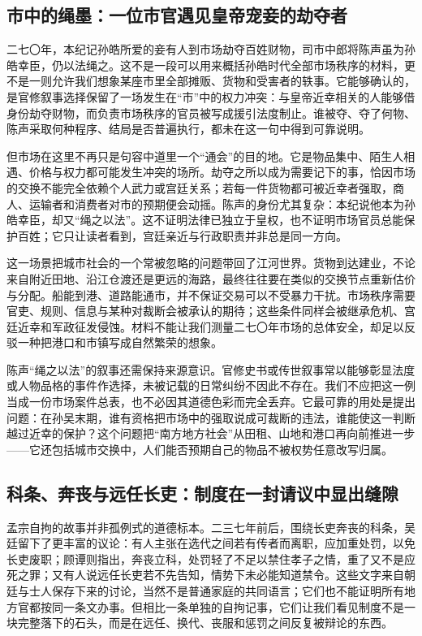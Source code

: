 \subsection{市中的绳墨：一位市官遇见皇帝宠妾的劫夺者}
二七〇年，本纪记孙皓所爱的妾有人到市场劫夺百姓财物，司市中郎将陈声虽为孙皓幸臣，仍以法绳之。这不是一段可以用来概括孙皓时代全部市场秩序的材料，更不是一则允许我们想象某座市里全部摊贩、货物和受害者的轶事。它能够确认的，是官修叙事选择保留了一场发生在“市”中的权力冲突：与皇帝近幸相关的人能够借身份劫夺财物，而负责市场秩序的官员被写成援引法度制止。谁被夺、夺了何物、陈声采取何种程序、结局是否普遍执行，都未在这一句中得到可靠说明。

但市场在这里不再只是句容中道里一个“通会”的目的地。它是物品集中、陌生人相遇、价格与权力都可能发生冲突的场所。劫夺之所以成为需要记下的事，恰因市场的交换不能完全依赖个人武力或宫廷关系；若每一件货物都可被近幸者强取，商人、运输者和消费者对市的预期便会动摇。陈声的身份尤其复杂：本纪说他本为孙皓幸臣，却又“绳之以法”。这不证明法律已独立于皇权，也不证明市场官员总能保护百姓；它只让读者看到，宫廷亲近与行政职责并非总是同一方向。

这一场景把城市社会的一个常被忽略的问题带回了江河世界。货物到达建业，不论来自附近田地、沿江仓渡还是更远的海路，最终往往要在类似的交换节点重新估价与分配。船能到港、道路能通市，并不保证交易可以不受暴力干扰。市场秩序需要官吏、规则、信息与某种对裁断会被承认的期待；这些条件同样会被继承危机、宫廷近幸和军政征发侵蚀。材料不能让我们测量二七〇年市场的总体安全，却足以反驳一种把港口和市镇写成自然繁荣的想象。

陈声“绳之以法”的叙事还需保持来源意识。官修史书或传世叙事常以能够彰显法度或人物品格的事件作选择，未被记载的日常纠纷不因此不存在。我们不应把这一例当成一份市场案件总表，也不必因其道德色彩而完全丢弃。它最可靠的用处是提出问题：在孙吴末期，谁有资格把市场中的强取说成可裁断的违法，谁能使这一判断越过近幸的保护？这个问题把“南方地方社会”从田租、山地和港口再向前推进一步——它还包括城市交换中，人们能否预期自己的物品不被权势任意改写归属。

\subsection{科条、奔丧与远任长吏：制度在一封请议中显出缝隙}
孟宗自拘的故事并非孤例式的道德标本。二三七年前后，围绕长吏奔丧的科条，吴廷留下了更丰富的议论：有人主张在选代之间若有传者而离职，应加重处罚，以免长吏废职；顾谭则指出，奔丧立科，处罚轻了不足以禁住孝子之情，重了又不是应死之罪；又有人说远任长吏若不先告知，情势下未必能知道禁令。这些文字来自朝廷与士人保存下来的讨论，当然不是普通家庭的共同语言；它们也不能证明所有地方官都按同一条文办事。但相比一条单独的自拘记事，它们让我们看见制度不是一块完整落下的石头，而是在远任、换代、丧服和惩罚之间反复被辩论的东西。

